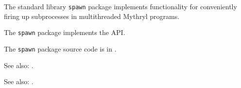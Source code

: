 
The standard library {\tt spawn} package implements functionality for conveniently 
firing up subprocesses in multithreaded Mythryl programs.

The {\tt spawn} package implements the  API.

The {\tt spawn} package source code is in .


See also:  .

See also:  .

